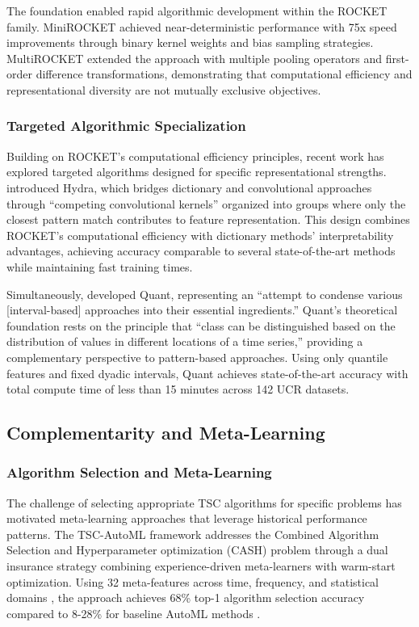 \documentclass[pdflatex,sn-basic]{sn-jnl}           %
\theoremstyle{thmstyleone}%
\theoremstyle{thmstyletwo}%
\theoremstyle{thmstylethree}%
\begin{document}
The foundation enabled rapid algorithmic development within the ROCKET family. MiniROCKET \cite{minirocket} achieved near-deterministic performance with 75x speed improvements through binary kernel weights and bias sampling strategies. MultiROCKET \cite{multirocket} extended the approach with multiple pooling operators and first-order difference transformations, demonstrating that computational efficiency and representational diversity are not mutually exclusive objectives.

\subsubsection{Targeted Algorithmic Specialization}

Building on ROCKET's computational efficiency principles, recent work has explored targeted algorithms designed for specific representational strengths. \citet[p.~1780]{hydra} introduced Hydra, which bridges dictionary and convolutional approaches through ``competing convolutional kernels'' organized into groups where only the closest pattern match contributes to feature representation. This design combines ROCKET's computational efficiency with dictionary methods' interpretability advantages, achieving accuracy comparable to several state-of-the-art methods while maintaining fast training times.

Simultaneously, \citet[p.~2377]{quant} developed Quant, representing an ``attempt to condense various [interval-based] approaches into their essential ingredients.'' Quant's theoretical foundation rests on the principle that ``class can be distinguished based on the distribution of values in different locations of a time series,'' providing a complementary perspective to pattern-based approaches. Using only quantile features and fixed dyadic intervals, Quant achieves state-of-the-art accuracy with total compute time of less than 15 minutes across 142 UCR datasets.

\subsection{Complementarity and Meta-Learning}

\subsubsection{Algorithm Selection and Meta-Learning}

The challenge of selecting appropriate TSC algorithms for specific problems has motivated meta-learning approaches that leverage historical performance patterns. The TSC-AutoML framework \citep{tsc-automl} addresses the Combined Algorithm Selection and Hyperparameter optimization (CASH) problem through a dual insurance strategy combining experience-driven meta-learners with warm-start optimization. Using 32 meta-features across time, frequency, and statistical domains \citep[Table~I, p.~8]{tsc-automl}, the approach achieves 68\% top-1 algorithm selection accuracy compared to 8-28\% for baseline AutoML methods \citep[Table~IV, p.~10]{tsc-automl}.
\end{document}
